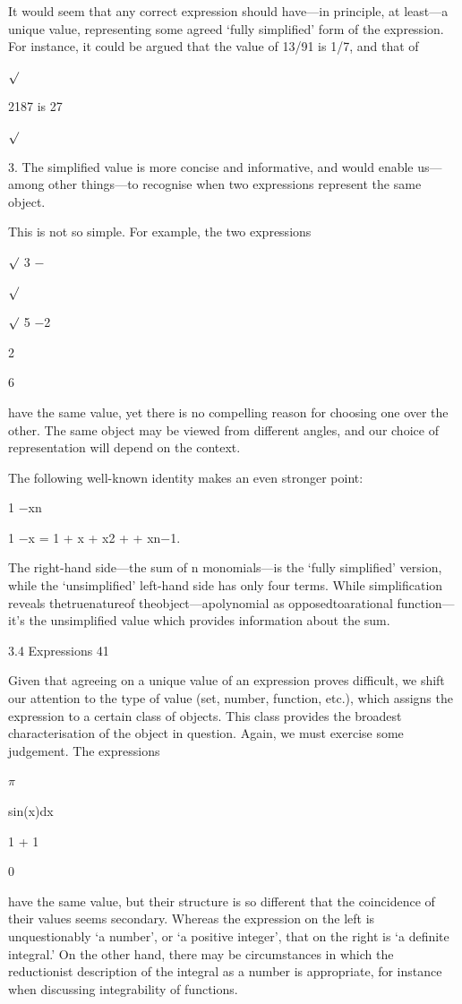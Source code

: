 \documentclass[11pt]{article}
\theoremstyle{plain}
\theoremstyle{definition}
\begin{document}
It would seem that any correct expression should have---in principle, at least---a unique value, representing some agreed `fully simplified' form of the expression. For instance, it could be argued that the value of 13/91 is 1/7, and that of

$\surd$

2187 is 27

$\surd$

3. The simplified value is more concise and informative, and would enable us---among other things---to recognise when two expressions represent the same object.

This is not so simple. For example, the two expressions

$\surd$ 3 $-$

$\surd$

$\surd$ 5 $-$2

2

6

have the same value, yet there is no compelling reason for choosing one over the other. The same object may be viewed from different angles, and our choice of representation will depend on the context.

The following well-known identity makes an even stronger point:

1 $-$xn

1 $-$x = 1 + x + x2 + \textperiodcentered{} \textperiodcentered{} \textperiodcentered{} + xn$-$1.

The right-hand side---the sum of n monomials---is the `fully simplified' version, while the `unsimplified' left-hand side has only four terms. While simplification reveals thetruenatureof theobject---apolynomial as opposedtoarational function--- it's the unsimplified value which provides information about the sum.

3.4 Expressions 41

Given that agreeing on a unique value of an expression proves difficult, we shift our attention to the type of value (set, number, function, etc.), which assigns the expression to a certain class of objects. This class provides the broadest characterisation of the object in question. Again, we must exercise some judgement. The expressions

$\pi$

sin(x)dx

1 + 1

0

have the same value, but their structure is so different that the coincidence of their values seems secondary. Whereas the expression on the left is unquestionably `a number', or `a positive integer', that on the right is `a definite integral.' On the other hand, there may be circumstances in which the reductionist description of the integral as a number is appropriate, for instance when discussing integrability of functions.
\end{document}
